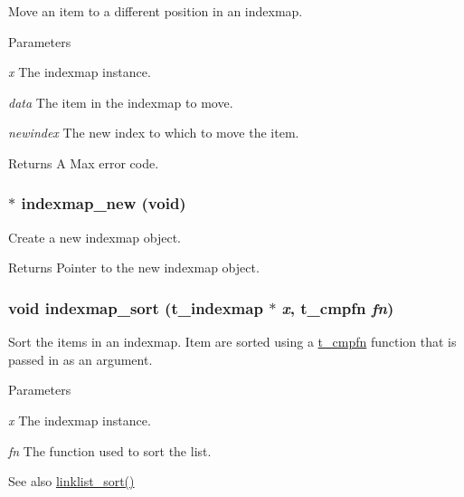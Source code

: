 Move an item to a different position in an indexmap. 
\begin{DoxyParams}{Parameters}
\item[{\em x}]The indexmap instance. \item[{\em data}]The item in the indexmap to move. \item[{\em newindex}]The new index to which to move the item. \end{DoxyParams}
\begin{DoxyReturn}{Returns}
A Max error code. 
\end{DoxyReturn}
\hypertarget{group__indexmap_ga2e7303d05103b7e42c1a12929f5233ec}{
\subsubsection[{indexmap\_\-new}]{$\ast$ indexmap\_\-new (void)}}
\label{group__indexmap_ga2e7303d05103b7e42c1a12929f5233ec}


Create a new indexmap object. \begin{DoxyReturn}{Returns}
Pointer to the new indexmap object. 
\end{DoxyReturn}
\hypertarget{group__indexmap_ga37c44ae6f93722ca5a722839ac62966d}{
\subsubsection[{indexmap\_\-sort}]{\setlength{\rightskip}{0pt plus 5cm}void indexmap\_\-sort ({\bf t\_\-indexmap} $\ast$ {\em x}, \/  {\bf t\_\-cmpfn} {\em fn})}}
\label{group__indexmap_ga37c44ae6f93722ca5a722839ac62966d}


Sort the items in an indexmap. Item are sorted using a \hyperlink{group__datastore_gaaf4ae6dd800a2be9abd645cf70aeb38f}{t\_\-cmpfn} function that is passed in as an argument.


\begin{DoxyParams}{Parameters}
\item[{\em x}]The indexmap instance. \item[{\em fn}]The function used to sort the list. \end{DoxyParams}
\begin{DoxySeeAlso}{See also}
\hyperlink{group__linklist_gaf01b5f67a8ceccdd75cff34f6ecdd8c2}{linklist\_\-sort()} 
\end{DoxySeeAlso}
